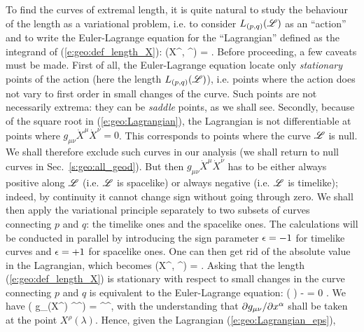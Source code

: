 To find the curves of extremal length, it is
quite natural to study the behaviour of the length as a
variational problem, i.e. to consider $L_{(p,q)}(\mathscr{L})$ as an ``action''
and to write the Euler-Lagrange equation
for the ``Lagrangian'' defined as the integrand of (\ref{e:geo:def_length_X}):
\be \label{e:geo:Lagrangian}
    (X^\alpha, ^\alpha) =  .
\ee
Before proceeding, a few
caveats must be made. First of all, the Euler-Lagrange equation
locate only \emph{stationary} points of the action (here the length
$L_{(p,q)}(\mathscr{L})$), i.e. points where the action does not vary
to first order in small changes of the curve. Such points are not
necessarily extrema: they can be \emph{saddle} points, as we shall see.
Secondly, because of the square root in (\ref{e:geo:Lagrangian}),
the Lagrangian is not differentiable at points where
$g_{\mu\nu} \dot{X}^\mu \dot{X}^\nu = 0$.
This corresponds to points where the curve $\mathscr{L}$ is null. We shall
therefore exclude such curves in our analysis (we shall return to null
curves in Sec.~\ref{s:geo:all_geod}). But then $g_{\mu\nu} \dot{X}^\mu \dot{X}^\nu$
has to be either always positive along $\mathscr{L}$ (i.e. $\mathscr{L}$
is spacelike) or always negative (i.e. $\mathscr{L}$ is timelike); indeed,
by continuity it cannot change sign without going through zero.
We shall then apply the variational principle separately
to two subsets of curves connecting $p$ and $q$: the timelike ones and the
spacelike ones. The calculations will be conducted in parallel by introducing
the sign parameter $\epsilon=-1$ for timelike curves and $\epsilon=+1$ for spacelike
ones. One can then get rid of the absolute value in the Lagrangian, which
becomes
\be \label{e:geo:Lagrangian_eps}
    (X^\alpha, ^\alpha) =  .
\ee
Asking that the length (\ref{e:geo:def_length_X}) is stationary
with respect to small changes in the curve connecting $p$ and $q$
is equivalent to the Euler-Lagrange equation:
\be \label{e:geo:Euler-Lagrange}
    \frac{\D}{\D\lambda}\left( \right)
        -  = 0 .
\ee
We have
\be \label{e:geo:der_gXX_X}
     \left( g_{\mu\nu}(X^\rho) ^\mu {}^\nu \right)
        =   ^\mu {}^\nu  ,
\ee
with the understanding that ${\partial g_{\mu\nu}}/{\partial x^\alpha}$ shall be
taken at the point $X^\rho(\lambda)$. Hence, given the Lagrangian (\ref{e:geo:Lagrangian_eps}),
\be \label{e:geo:derL_X}
